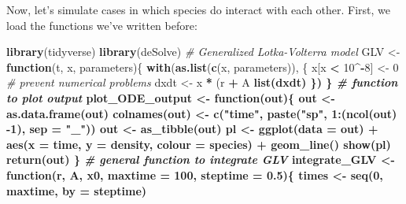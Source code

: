 \documentclass[]{book}
\newenvironment{Shaded}{\begin{snugshade}}{\end{snugshade}}
\newcommand{\CommentTok}[1]{\textcolor[rgb]{0.56,0.35,0.01}{\textit{#1}}}
\newcommand{\ControlFlowTok}[1]{\textcolor[rgb]{0.13,0.29,0.53}{\textbf{#1}}}
\newcommand{\DataTypeTok}[1]{\textcolor[rgb]{0.13,0.29,0.53}{#1}}
\newcommand{\DecValTok}[1]{\textcolor[rgb]{0.00,0.00,0.81}{#1}}
\newcommand{\FloatTok}[1]{\textcolor[rgb]{0.00,0.00,0.81}{#1}}
\newcommand{\KeywordTok}[1]{\textcolor[rgb]{0.13,0.29,0.53}{\textbf{#1}}}
\newcommand{\NormalTok}[1]{#1}
\newcommand{\OperatorTok}[1]{\textcolor[rgb]{0.81,0.36,0.00}{\textbf{#1}}}
\newcommand{\StringTok}[1]{\textcolor[rgb]{0.31,0.60,0.02}{#1}}
\begin{document}
Now, let's simulate cases in which species do interact with each other. First, we load the functions we've written before:

\begin{Shaded}
\begin{Highlighting}[]
\KeywordTok{library}\NormalTok{(tidyverse)}
\KeywordTok{library}\NormalTok{(deSolve)}
\CommentTok{# Generalized Lotka-Volterra model}
\NormalTok{GLV <-}\StringTok{ }\ControlFlowTok{function}\NormalTok{(t, x, parameters)\{}
  \KeywordTok{with}\NormalTok{(}\KeywordTok{as.list}\NormalTok{(}\KeywordTok{c}\NormalTok{(x, parameters)), \{}
\NormalTok{    x[x }\OperatorTok{<}\StringTok{ }\DecValTok{10}\OperatorTok{^-}\DecValTok{8}\NormalTok{] <-}\StringTok{ }\DecValTok{0} \CommentTok{# prevent numerical problems}
\NormalTok{    dxdt <-}\StringTok{ }\NormalTok{x }\OperatorTok{*}\StringTok{ }\NormalTok{(r }\OperatorTok{+}\StringTok{ }\NormalTok{A }\OperatorTok{%
    \KeywordTok{list}\NormalTok{(dxdt)}
\NormalTok{  \})}
\NormalTok{\}}
\CommentTok{# function to plot output}
\NormalTok{plot_ODE_output <-}\StringTok{ }\ControlFlowTok{function}\NormalTok{(out)\{}
\NormalTok{  out <-}\StringTok{ }\KeywordTok{as.data.frame}\NormalTok{(out)}
  \KeywordTok{colnames}\NormalTok{(out) <-}\StringTok{ }\KeywordTok{c}\NormalTok{(}\StringTok{"time"}\NormalTok{, }\KeywordTok{paste}\NormalTok{(}\StringTok{"sp"}\NormalTok{, }\DecValTok{1}\OperatorTok{:}\NormalTok{(}\KeywordTok{ncol}\NormalTok{(out) }\DecValTok{-1}\NormalTok{), }\DataTypeTok{sep =} \StringTok{"_"}\NormalTok{))}
\NormalTok{  out <-}\StringTok{ }\KeywordTok{as_tibble}\NormalTok{(out) }\OperatorTok{%
\NormalTok{  pl <-}\StringTok{ }\KeywordTok{ggplot}\NormalTok{(}\DataTypeTok{data =}\NormalTok{ out) }\OperatorTok{+}\StringTok{ }
\StringTok{    }\KeywordTok{aes}\NormalTok{(}\DataTypeTok{x =}\NormalTok{ time, }\DataTypeTok{y =}\NormalTok{ density, }\DataTypeTok{colour =}\NormalTok{ species) }\OperatorTok{+}\StringTok{ }
\StringTok{    }\KeywordTok{geom_line}\NormalTok{()}
  \KeywordTok{show}\NormalTok{(pl)}
  \KeywordTok{return}\NormalTok{(out)}
\NormalTok{\}}
\CommentTok{# general function to integrate GLV}
\NormalTok{integrate_GLV <-}\StringTok{ }\ControlFlowTok{function}\NormalTok{(r, A, x0, }\DataTypeTok{maxtime =} \DecValTok{100}\NormalTok{, }\DataTypeTok{steptime =} \FloatTok{0.5}\NormalTok{)\{}
\NormalTok{  times <-}\StringTok{ }\KeywordTok{seq}\NormalTok{(}\DecValTok{0}\NormalTok{, maxtime, }\DataTypeTok{by =}\NormalTok{ steptime)}
}}
\end{Highlighting}
\end{Shaded}
\end{document}
